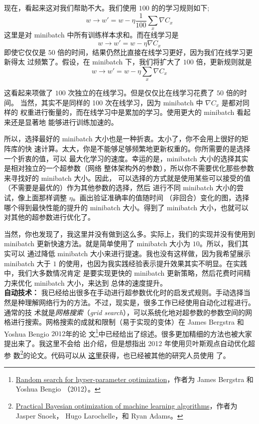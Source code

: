 现在，看起来这对我们帮助不大。我们使用 $100$ 的\minibatch{}的学习规则如下;
\begin{equation}
  w \rightarrow w' = w-\eta \frac{1}{100} \sum_x \nabla C_x
  \label{eq:100}\tag{100}
\end{equation}
这里是对 minibatch 中所有训练样本求和。而在线学习是
\begin{equation}
  w \rightarrow w' = w-\eta \nabla C_x
  \label{eq:101}\tag{101}
\end{equation}
即使它仅仅是 $50$ 倍的时间，结果仍然比直接在线学习更好，因为我们在线学习更新得太
过频繁了。假设，在 minibatch 下，我们将\learningrate{}扩大了 $100$ 倍，更新规则就是
\begin{equation}
  w \rightarrow w' = w-\eta \sum_x \nabla C_x
  \label{eq:102}\tag{102}
\end{equation}

这看起来项做了 $100$ 次独立的在线学习。但是仅仅比在线学习花费了 $50$ 倍的时间。
当然，其实不是同样的 100 次在线学习，因为 minibatch 中 $\nabla C_x$ 是都对同样的
权重进行衡量的，而在线学习中是累加的学习。使用更大的 minibatch 看起来还是显著地
能够进行训练加速的。

所以，选择最好的 minibatch 大小也是一种折衷。太小了，你不会用上很好的矩阵库的快
速计算。太大，你是不能够足够频繁地更新权重的。你所需要的是选择一个折衷的值，可以
最大化学习的速度。幸运的是，minibatch 大小的选择其实是相对独立的一个超参数（网络
  整体架构外的参数），所以你不需要优化那些参数来寻找好的 minibatch 大小。因此，
可以选择的方式就是使用某些可以接受的值（不需要是最优的）作为其他参数的选择，然后
进行不同 minibatch 大小的尝试，像上面那样调整 $\eta$。画出验证准确率的值随时间
（非回合）变化的图，选择哪个得到最快性能的提升的 minibatch 大小。得到了
minibatch 大小，也就可以对其他的超参数进行优化了。

当然，你也发现了，我这里并没有做到这么多。实际上，我们的实现并没有使用到
minibatch 更新快速方法。就是简单使用了 minibatch 大小为 $10$。所以，我们其实可以
通过降低 minibatch 大小来进行提速。我也没有这样做，因为我希望展示 minibatch 大于
$1$ 的使用，也因为我实践经验表示提升效果其实不明显。在实践中，我们大多数情况肯定
是要实现更快的 minibatch 更新策略，然后花费时间精力来优化 minibatch 大小，来达到
总体的速度提升。\\

\textbf{自动技术：} 我已经给出很多在手动进行超参数优化时的启发式规则。手动选择当
然是种理解网络行为的方法。不过，现实是，很多工作已经使用自动化过程进行。通常的技
术就是\emph{网格搜索}（\emph{grid search}），可以系统化地对超参数的参数空间的网
格进行搜索。网格搜索的成就和限制（易于实现的变体）在 James Bergstra 和 Yoshua
Bengio $2012$年的论
文\footnote{\href{http://dl.acm.org/citation.cfm?id=2188395}{Random search for
    hyper-parameter optimization}，作者为 James Bergstra 和 Yoshua Bengio
  （2012）。}中已经给出了综述。很多更加精细的方法也被大家提出来了。我这里不会给
出介绍，但是想指出 2012 年使用贝叶斯观点自动优化超参
数\footnote{\href{http://papers.nips.cc/paper/4522-practical-bayesian-optimization-of-machine-learning-algorithms.pdf}{Practical
    Bayesian optimization of machine learning algorithms}，作者为 Jasper Snoek，
  Hugo Larochelle，和 Ryan Adams。}的论文。代码可以从%
\href{https://github.com/jaberg/hyperopt}{这里}获得，也已经被其他的研究人员使用
了。\\

